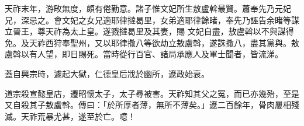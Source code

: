 \begin{pinyinscope}
 天祚末年，游畋無度，頗有倦勤意。諸子惟文妃所生敖盧斡最賢。蕭奉先乃元妃兄，深忌之。會文妃之女兄適耶律撻曷里，女弟適耶律餘睹，奉先乃誣告余睹等謀立晉王，尊天祚為太上皇。遂戮撻曷里及其妻，賜
 文妃自盡，敖盧斡以不與謀得免。及天祚西狩奉聖州，又以耶律撒八等欲劫立敖盧斡，遂誅撒八，盡其黨與。敖盧斡以有人望，即日賜死。當時從行百官、諸局承應人及軍士聞者，皆流涕。



 蓋自興宗時，遽起大獄，仁德皇后戕於幽所，遼政始衰。



 道宗殺宣懿皇店，遷昭懷太子，太子尋被害。天祚知其父之冤，而已亦幾殆，至是又自殺其子敖盧斡。傳曰：「於所厚者薄，無所不薄矣。」遼二百餘年，骨肉屢相殘滅。天祚荒暴尤甚，遂至於亡。噫！



\end{pinyinscope}